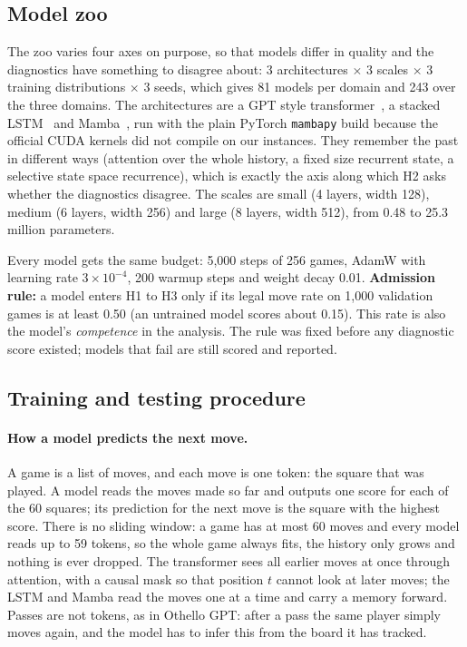 \documentclass[11pt]{scrartcl}
\begin{document}
\subsection{Model zoo}

The zoo varies four axes on purpose, so that models differ in quality and the diagnostics have something to
disagree about: 3 architectures $\times$ 3 scales $\times$ 3 training distributions $\times$ 3 seeds, which gives
81 models per domain and 243 over the three domains. The architectures are a GPT style
transformer~\cite{vaswani2017attention}, a stacked LSTM~\cite{hochreiter1997lstm} and
Mamba~\cite{gu2023mamba}, run with the plain PyTorch \texttt{mambapy} build because the official CUDA kernels
did not compile on our instances. They remember the past in different ways (attention over the whole history,
a fixed size recurrent state, a selective state space recurrence), which is exactly the axis along which H2
asks whether the diagnostics disagree. The scales are small (4 layers, width 128), medium (6 layers, width
256) and large (8 layers, width 512), from 0.48 to 25.3 million parameters.

Every model gets the same budget: 5,000 steps of 256 games, AdamW with learning rate $3\times10^{-4}$, 200
warmup steps and weight decay 0.01. \textbf{Admission rule:} a model enters H1 to H3 only if its legal move
rate on 1,000 validation games is at least 0.50 (an untrained model scores about 0.15). This rate is also the
model's \emph{competence} in the analysis. The rule was fixed before any diagnostic score existed; models that
fail are still scored and reported.

\subsection{Training and testing procedure}
\label{sec:training}

\paragraph{How a model predicts the next move.} A game is a list of moves, and each move is one token: the
square that was played. A model reads the moves made so far and outputs one score for each of the 60 squares;
its prediction for the next move is the square with the highest score. There is no sliding window: a game has
at most 60 moves and every model reads up to 59 tokens, so the whole game always fits, the history only grows
and nothing is ever dropped. The transformer sees all earlier moves at once through attention, with a causal
mask so that position $t$ cannot look at later moves; the LSTM and Mamba read the moves one at a time and
carry a memory forward. Passes are not tokens, as in Othello GPT: after a pass the same player simply moves
again, and the model has to infer this from the board it has tracked.
\end{document}

